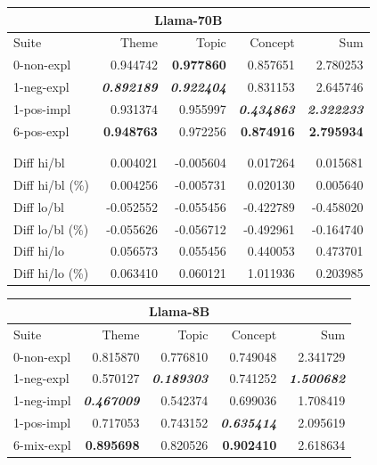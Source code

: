 \begin{table}
    \centering
    \tiny

    \begin{tabular}{lrrrr}
    \toprule
    \multicolumn{5}{c}{\textbf{Llama-70B}} \\
    \midrule
    Suite & Theme & Topic & Concept & Sum \\
    \midrule
    0-non-expl & 0.944742 & \bfseries 0.977860 & 0.857651 & 2.780253 \\
    1-neg-expl & \bfseries \itshape 0.892189 & \bfseries \itshape 0.922404 & 0.831153 & 2.645746 \\
    1-pos-impl & 0.931374 & 0.955997 & \bfseries \itshape 0.434863 & \bfseries \itshape 2.322233 \\
    6-pos-expl & \bfseries 0.948763 & 0.972256 & \bfseries 0.874916 & \bfseries 2.795934 \\
     & & & & \\
     & & & & \\
    \midrule
    Diff hi/bl & 0.004021 & -0.005604 & 0.017264 & 0.015681 \\
    Diff hi/bl (\%) & 0.004256 & -0.005731 & 0.020130 & 0.005640 \\
    \midrule
    Diff lo/bl & -0.052552 & -0.055456 & -0.422789 & -0.458020 \\
    Diff lo/bl (\%) & -0.055626 & -0.056712 & -0.492961 & -0.164740 \\
    \midrule
    Diff hi/lo & 0.056573 & 0.055456 & 0.440053 & 0.473701 \\
    Diff hi/lo (\%) & 0.063410 & 0.060121 & 1.011936 & 0.203985 \\
    \bottomrule
    \end{tabular}
    \begin{tabular}{lrrrr}
    \toprule
    \multicolumn{5}{c}{\textbf{Llama-8B}} \\
    \midrule
    Suite & Theme & Topic & Concept & Sum \\
    \midrule
    0-non-expl & 0.815870 & 0.776810 & 0.749048 & 2.341729 \\
    1-neg-expl & 0.570127 & \bfseries \itshape 0.189303 & 0.741252 & \bfseries \itshape 1.500682 \\
    1-neg-impl & \bfseries \itshape 0.467009 & 0.542374 & 0.699036 & 1.708419 \\
    1-pos-impl & 0.717053 & 0.743152 & \bfseries \itshape 0.635414 & 2.095619 \\
    6-mix-expl & \bfseries 0.895698 & 0.820526 & \bfseries 0.902410 & 2.618634 \\

\end{tabular}
\end{table}
